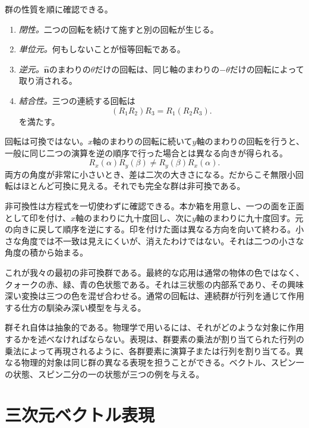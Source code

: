 群の性質を順に確認できる。
\begin{enumerate}
\item \emph{閉性。}二つの回転を続けて施すと別の回転が生じる。
\item \emph{単位元。}何もしないことが恒等回転である。
\item \emph{逆元。}\(\hat{\boldsymbol n}\)のまわりの\(\theta\)だけの回転は、同じ軸のまわりの\(-\theta\)だけの回転によって取り消される。
\item \emph{結合性。}三つの連続する回転は
\[
(R_1R_2)R_3=R_1(R_2R_3).
\]
を満たす。
\end{enumerate}

回転は可換ではない。\(x\)軸のまわりの回転に続いて\(y\)軸のまわりの回転を行うと、一般に同じ二つの演算を逆の順序で行った場合とは異なる向きが得られる。
\begin{equation}
R_x(\alpha)R_y(\beta)\ne R_y(\beta)R_x(\alpha).
\end{equation}
両方の角度が非常に小さいとき、差は二次の大きさになる。だからこそ無限小回転はほとんど可換に見える。それでも完全な群は非可換である。

非可換性は方程式を一切使わずに確認できる。本か箱を用意し、一つの面を正面として印を付け、\(x\)軸のまわりに九十度回し、次に\(y\)軸のまわりに九十度回す。元の向きに戻して順序を逆にする。印を付けた面は異なる方向を向いて終わる。小さな角度では不一致は見えにくいが、消えたわけではない。それは二つの小さな角度の積から始まる。

\begin{classroomqa}
\end{classroomqa}

これが我々の最初の非可換群である。最終的な応用は通常の物体の色ではなく、クォークの赤、緑、青の色状態である。それは三状態の内部系であり、その興味深い変換は三つの色を混ぜ合わせる。通常の回転は、連続群が行列を通じて作用する仕方の馴染み深い模型を与える。

群それ自体は抽象的である。物理学で用いるには、それがどのような対象に作用するかを述べなければならない。{表現}は、群要素の乗法が割り当てられた行列の乗法によって再現されるように、各群要素に演算子または行列を割り当てる。異なる物理的対象は同じ群の異なる表現を担うことができる。ベクトル、スピン一の状態、スピン二分の一の状態が三つの例を与える。

\section{三次元ベクトル表現}

